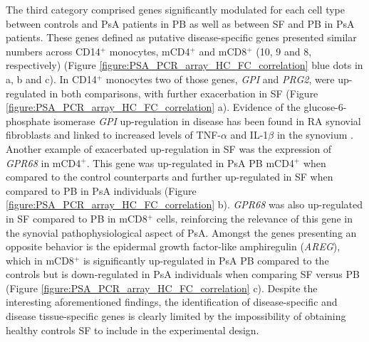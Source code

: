 The third category comprised genes significantly modulated for each cell type between controls and PsA patients in PB as well as between SF and PB in PsA patients. These genes defined as putative disease-specific genes presented similar numbers across CD14$^+$ monocytes, mCD4$^+$ and mCD8$^+$ (10, 9 and 8, respectively) (Figure \ref{figure:PSA_PCR_array_HC_FC_correlation} blue dots in a, b and c). In CD14$^+$ monocytes two of those genes, \textit{GPI} and \textit{PRG2}, were up-regulated in both comparisons, with further exacerbation in SF (Figure \ref{figure:PSA_PCR_array_HC_FC_correlation} a). Evidence of the glucose-6-phosphate isomerase \textit{GPI} up-regulation in disease has been found in RA synovial fibroblasts and linked to increased levels of TNF-$\alpha$ and IL-1$\beta$ in the synovium \parencite{Zhong2015}. %
Another example of exacerbated up-regulation in SF was the expression of \textit{GPR68} in mCD4$^+$. This gene was up-regulated in PsA PB mCD4$^+$ when compared to the control counterparts and further up-regulated in SF when compared to PB in PsA individuals (Figure \ref{figure:PSA_PCR_array_HC_FC_correlation} b). %
\textit{GPR68} was also up-regulated in SF compared to PB in mCD8$^+$ cells, reinforcing the relevance of this gene in the synovial pathophysiological aspect of PsA. Amongst the genes presenting an opposite behavior is the epidermal growth factor-like amphiregulin (\textit{AREG}), which in mCD8$^+$ is significantly up-regulated in PsA PB compared to the controls but is down-regulated in PsA individuals when comparing SF versus PB (Figure \ref{figure:PSA_PCR_array_HC_FC_correlation} c). %
Despite the interesting aforementioned findings, the identification of disease-specific and disease tissue-specific genes is clearly limited by the impossibility of obtaining healthy controls SF to include in the experimental design. 

